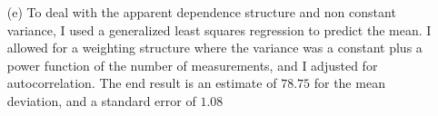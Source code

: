 \documentclass[11pt]{article}
\theoremstyle{definition}
\begin{document}
\begin{itemize}
\begin{itemize}
            \item[(e)]
                To deal with the apparent dependence structure and non constant variance, I used a generalized least squares regression to predict the mean. I allowed for a weighting structure where the variance was a constant plus a power function of the number of measurements, and I adjusted for autocorrelation. The end result is an estimate of $78.75$ for the mean deviation, and a standard error of $1.08$
                
        \end{itemize}
\end{itemize}
\end{document}
